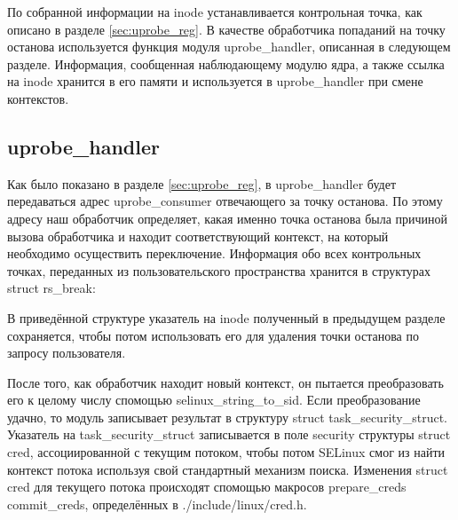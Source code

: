 По собранной информации на inode устанавливается контрольная точка, как
описано в разделе \ref{sec:uprobe_reg}. В качестве обработчика попаданий
на точку останова используется функция модуля uprobe\_handler, описанная
в следующем разделе.  Информация, сообщенная наблюдающему модулю ядра, а
также ссылка на inode хранится в его памяти и используется в
uprobe\_handler при смене контекстов.

\subsection{uprobe\_handler}

Как было показано в разделе \ref{sec:uprobe_reg}, в uprobe\_handler
будет передаваться адрес uprobe\_consumer отвечающего за точку останова.
По этому адресу наш обработчик определяет, какая именно точка останова
была причиной вызова обработчика и находит соответствующий контекст, на
который необходимо осуществить переключение. Информация обо всех
контрольных точках, переданных из пользовательского пространства
хранится в структурах struct rs\_break:


\bigskip

В приведённой структуре указатель на inode полученный в предыдущем
разделе сохраняется, чтобы потом использовать его для удаления точки
останова по запросу пользователя. 

После того, как обработчик находит новый контекст, он пытается
преобразовать его к целому числу спомощью selinux\_string\_to\_sid. Если
преобразование удачно, то модуль записывает результат в структуру struct
task\_security\_struct.  Указатель на task\_security\_struct
записывается в поле security структуры struct cred, ассоциированной с
текущим потоком, чтобы потом SELinux смог из найти контекст потока
используя свой стандартный механизм поиска. Изменения struct cred для
текущего потока происходят спомощью макросов prepare\_creds
commit\_creds, определённых в ./include/linux/cred.h.

